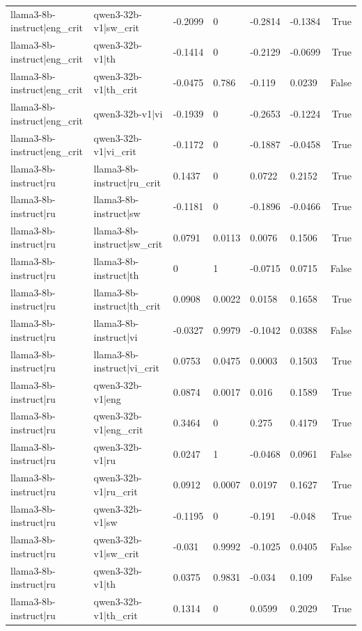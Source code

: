 \begin{table}
\begin{tabular}{llllllr}
llama3-8b-instruct|eng_crit & qwen3-32b-v1|sw_crit & -0.2099 & 0 & -0.2814 & -0.1384 & True \\
llama3-8b-instruct|eng_crit & qwen3-32b-v1|th & -0.1414 & 0 & -0.2129 & -0.0699 & True \\
llama3-8b-instruct|eng_crit & qwen3-32b-v1|th_crit & -0.0475 & 0.786 & -0.119 & 0.0239 & False \\
llama3-8b-instruct|eng_crit & qwen3-32b-v1|vi & -0.1939 & 0 & -0.2653 & -0.1224 & True \\
llama3-8b-instruct|eng_crit & qwen3-32b-v1|vi_crit & -0.1172 & 0 & -0.1887 & -0.0458 & True \\
llama3-8b-instruct|ru & llama3-8b-instruct|ru_crit & 0.1437 & 0 & 0.0722 & 0.2152 & True \\
llama3-8b-instruct|ru & llama3-8b-instruct|sw & -0.1181 & 0 & -0.1896 & -0.0466 & True \\
llama3-8b-instruct|ru & llama3-8b-instruct|sw_crit & 0.0791 & 0.0113 & 0.0076 & 0.1506 & True \\
llama3-8b-instruct|ru & llama3-8b-instruct|th & 0 & 1 & -0.0715 & 0.0715 & False \\
llama3-8b-instruct|ru & llama3-8b-instruct|th_crit & 0.0908 & 0.0022 & 0.0158 & 0.1658 & True \\
llama3-8b-instruct|ru & llama3-8b-instruct|vi & -0.0327 & 0.9979 & -0.1042 & 0.0388 & False \\
llama3-8b-instruct|ru & llama3-8b-instruct|vi_crit & 0.0753 & 0.0475 & 0.0003 & 0.1503 & True \\
llama3-8b-instruct|ru & qwen3-32b-v1|eng & 0.0874 & 0.0017 & 0.016 & 0.1589 & True \\
llama3-8b-instruct|ru & qwen3-32b-v1|eng_crit & 0.3464 & 0 & 0.275 & 0.4179 & True \\
llama3-8b-instruct|ru & qwen3-32b-v1|ru & 0.0247 & 1 & -0.0468 & 0.0961 & False \\
llama3-8b-instruct|ru & qwen3-32b-v1|ru_crit & 0.0912 & 0.0007 & 0.0197 & 0.1627 & True \\
llama3-8b-instruct|ru & qwen3-32b-v1|sw & -0.1195 & 0 & -0.191 & -0.048 & True \\
llama3-8b-instruct|ru & qwen3-32b-v1|sw_crit & -0.031 & 0.9992 & -0.1025 & 0.0405 & False \\
llama3-8b-instruct|ru & qwen3-32b-v1|th & 0.0375 & 0.9831 & -0.034 & 0.109 & False \\
llama3-8b-instruct|ru & qwen3-32b-v1|th_crit & 0.1314 & 0 & 0.0599 & 0.2029 & True \\

\end{tabular}
\end{table}
